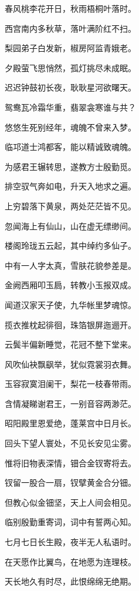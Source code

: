 \documentclass[12pt,UTF-8,openany,fontset=none]{ctexbook}
\begin{document}
\begin{center}
\begin{Large}
        春风桃李花开日，秋雨梧桐叶落时。

        西宫南内多秋草，落叶满阶红不扫。

        梨园弟子白发新，椒房阿监青娥老。

        夕殿萤飞思悄然，孤灯挑尽未成眠。

        迟迟钟鼓初长夜，耿耿星河欲曙天。

        鸳鸯瓦冷霜华重，翡翠衾寒谁与共？

        悠悠生死别经年，魂魄不曾来入梦。

        临邛道士鸿都客，能以精诚致魂魄。

        为感君王辗转思，遂教方士殷勤觅。

        排空驭气奔如电，升天入地求之遍。

        上穷碧落下黄泉，两处茫茫皆不见。

        忽闻海上有仙山，山在虚无缥缈间。

        楼阁玲珑五云起，其中绰约多仙子。

        中有一人字太真，雪肤花貌参差是。

        金阙西厢叩玉扃，转教小玉报双成。

        闻道汉家天子使，九华帐里梦魂惊。

        揽衣推枕起徘徊，珠箔银屏迤逦开。

        云鬓半偏新睡觉，花冠不整下堂来。

        风吹仙袂飘飖举，犹似霓裳羽衣舞。

        玉容寂寞泪阑干，梨花一枝春带雨。

        含情凝睇谢君王，一别音容两渺茫。

        昭阳殿里恩爱绝，蓬莱宫中日月长。

        回头下望人寰处，不见长安见尘雾。

        惟将旧物表深情，钿合金钗寄将去。

        钗留一股合一扇，钗擘黄金合分钿。

        但教心似金钿坚，天上人间会相见。

        临别殷勤重寄词，词中有誓两心知。

        七月七日长生殿，夜半无人私语时。

        在天愿作比翼鸟，在地愿为连理枝。

        天长地久有时尽，此恨绵绵无绝期。

    \end{Large}

\end{center}
\end{document}
